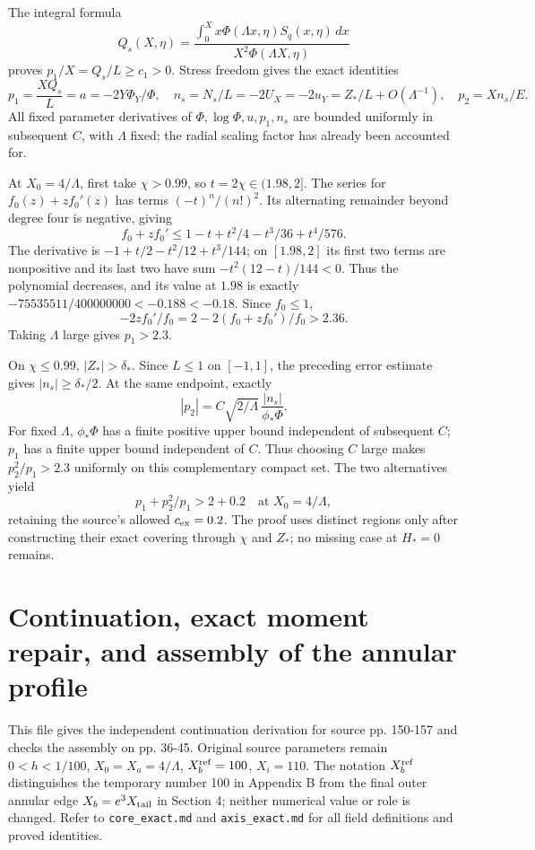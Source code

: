 \documentclass[10pt,a4paper]{article}
\begin{document}
The integral formula
\[
Q_s(X,\eta)=\frac{\int_0^Xx\Phi(\Lambda x,\eta)S_q(x,\eta)\,dx}
{X^2\Phi(\Lambda X,\eta)}
\]
proves \(p_1/X=Q_s/L\ge c_1>0\). Stress freedom gives the exact identities
\[
p_1=\frac{XQ_s}L=a=-2Y\Phi_Y/\Phi,
\quad n_s=N_s/L=-2U_X=-2u_Y=Z_*/L+O(\Lambda^{-1}),
\quad p_2=Xn_s/E.
\]
All fixed parameter derivatives of \(\Phi,\log\Phi,u,p_1,n_s\) are bounded uniformly in subsequent \(C\), with \(\Lambda\) fixed; the radial scaling factor has already been accounted for.

At \(X_0=4/\Lambda\), first take \(\chi>0.99\), so \(t=2\chi\in(1.98,2]\). The series for \(f_0(z)+zf_0'(z)\) has terms \((-t)^n/(n!)^2\). Its alternating remainder beyond degree four is negative, giving
\[
f_0+zf_0'\le1-t+t^2/4-t^3/36+t^4/576.
\]
The derivative is \(-1+t/2-t^2/12+t^3/144\); on \([1.98,2]\) its first two terms are nonpositive and its last two have sum \(-t^2(12-t)/144<0\). Thus the polynomial decreases, and its value at \(1.98\) is exactly \(-75535511/400000000<-0.188<-0.18\). Since \(f_0\le1\),
\[
-2zf_0'/f_0=2-2(f_0+zf_0')/f_0>2.36.
\]
Taking \(\Lambda\) large gives \(p_1>2.3\).

On \(\chi\le0.99\), \(|Z_*|>\delta_*\). Since \(L\le1\) on \([-1,1]\), the preceding error estimate gives \(|n_s|\ge\delta_*/2\). At the same endpoint, exactly
\[
|p_2|=C\sqrt{2/\Lambda}\,\frac{|n_s|}{\phi_*\Phi}.
\]
For fixed \(\Lambda\), \(\phi_*\Phi\) has a finite positive upper bound independent of subsequent \(C\); \(p_1\) has a finite upper bound independent of \(C\). Thus choosing \(C\) large makes \(p_2^2/p_1>2.3\) uniformly on this complementary compact set. The two alternatives yield
\[
p_1+p_2^2/p_1>2+0.2
\quad\text{at }X_0=4/\Lambda,
\]
retaining the source's allowed \(c_{\rm ex}=0.2\). The proof uses distinct regions only after constructing their exact covering through \(\chi\) and \(Z_*\); no missing case at \(H_*=0\) remains.


\section{Continuation, exact moment repair, and assembly of the annular profile}

This file gives the independent continuation derivation for source pp. 150-157 and checks the assembly on pp. 36-45. Original source parameters remain \(0<h<1/100\), \(X_0=X_a=4/\Lambda\), \(X_b^{\rm ref}=100\), \(X_i=110\). The notation \(X_b^{\rm ref}\) distinguishes the temporary number 100 in Appendix B from the final outer annular edge \(X_b=e^3X_{\rm tail}\) in Section 4; neither numerical value or role is changed. Refer to \texttt{core\_exact.md} and \texttt{axis\_exact.md} for all field definitions and proved identities.
\end{document}
